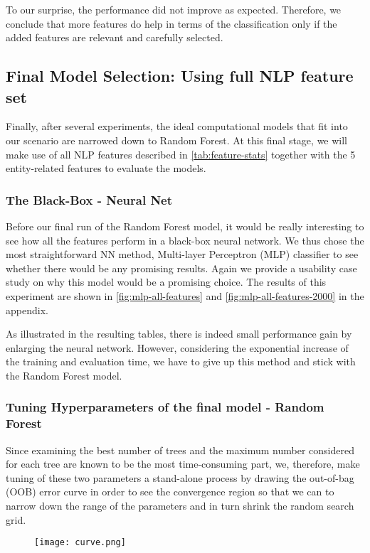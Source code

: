 To our surprise, the performance did not improve as expected.
Therefore, we conclude that more features do help in terms of the classification only if the added features are relevant and carefully selected.

\subsection{Final Model Selection: Using full NLP feature set}
Finally, after several experiments, the ideal computational models that fit into our scenario are narrowed down to Random Forest.
At this final stage, we will make use of all NLP features described in \autoref{tab:feature-stats} together with the 5 entity-related features to evaluate the models.

\subsubsection{The Black-Box - Neural Net }
Before our final run of  the Random Forest model, it would be really interesting to see how all the features perform in a black-box neural network.
We thus chose the most straightforward NN method, Multi-layer Perceptron (MLP) classifier \cite{x6} to see whether there would be any promising results.
Again we provide a usability case study \cite{8} on why this model would be a promising choice. The results of this experiment are shown in \autoref{fig:mlp-all-features} and \autoref{fig:mlp-all-features-2000} in the appendix.

As illustrated in the resulting tables, there is indeed small performance gain by enlarging the neural  network.
However, considering the exponential increase of the training and evaluation time, we have to give up this method and stick with the Random Forest model.

\subsubsection{Tuning Hyperparameters of the final model - Random Forest}
Since examining the best number of trees and the maximum number considered for each tree are known to be the most time-consuming part, we, therefore,
make tuning of these two parameters a stand-alone process by drawing the out-of-bag (OOB) error curve \cite{x7} in order to see the convergence region so that we can to narrow down the range of the parameters and in turn shrink the random search grid.

\begin{figure}[h]
  \centering
  \texttt{[image: curve.png]}
  \caption{}
  \label{fig:curve}
\end{figure}


